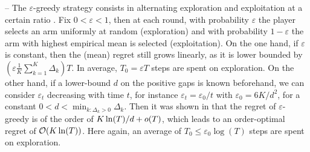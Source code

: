 -- The \textcolor{deeppurple}{$\varepsilon$-greedy strategy} consists in alternating exploration and exploitation at a certain ratio \cite{SuttonBarto2018,Bubeck12,LattimoreBanditAlgorithmsBook}.
Fix $0<\varepsilon<1$, then at each round, with probability $\varepsilon$ the player selects an arm uniformly at random (exploration) and with probability $1-\varepsilon$ the arm with highest empirical mean is selected (exploitation).
On the one hand, if $\varepsilon$ is constant, then the (mean) regret still grows linearly, as it is lower bounded by $(\varepsilon \frac{1}{K} \sum_{k=1}^K \Delta_k) T$.
In average, $T_0 = \varepsilon T$ steps are spent on exploration.
%
On the other hand, if a lower-bound $d$ on the positive gaps is known beforehand,
we can consider $\varepsilon_t$ decreasing with time $t$, for instance $\varepsilon_t = \varepsilon_0 / t$ with $\varepsilon_0 = 6 K / d^2$, for a constant $0 < d < \min_{k: \Delta_k > 0} \Delta_k$.
Then it was shown in \cite{Auer02} that the regret of $\varepsilon$-greedy is of the order of $K \ln(T) / d + \mathop{}\mathopen{}o\mathopen{}\left(T\right)$, which leads to an order-optimal regret of $\mathop{}\mathopen{}\mathcal{O}\mathopen{}\left(K \ln(T)\right)$.
Here again, an average of $T_0 \leq \varepsilon_0 \log(T)$ steps are spent on exploration.

